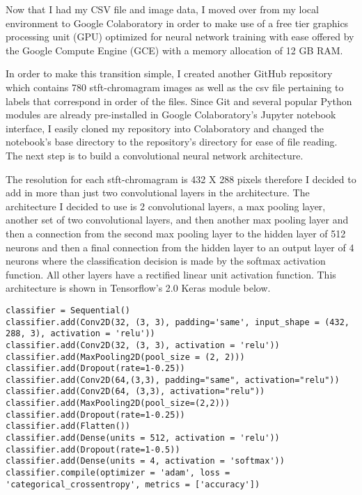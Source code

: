 Now that I had my CSV file and image data, I moved over from my local environment to Google Colaboratory in order to make use of a free tier graphics processing unit (GPU) optimized for neural network training with ease offered by the Google Compute Engine (GCE) with a memory allocation of 12 GB RAM.
\par
In order to make this transition simple, I created another GitHub repository which contains 780 stft-chromagram images as well as the csv file pertaining to labels that correspond in order of the files. Since Git and several popular Python modules are already pre-installed in Google Colaboratory's Jupyter notebook interface, I easily cloned my repository into Colaboratory and changed the notebook's base directory to the repository's directory for ease of file reading. The next step is to build a convolutional neural network architecture.
\par
The resolution for each stft-chromagram is 432 X 288 pixels therefore I decided to add in more than just two convolutional layers in the architecture. The architecture I decided to use is 2 convolutional layers, a max pooling layer, another set of two convolutional layers, and then another max pooling layer and then a connection from the second max pooling layer to the hidden layer of 512 neurons and then a final connection from the hidden layer to an output layer of 4 neurons where the classification decision is made by the softmax activation function. All other layers have a rectified linear unit activation function. This architecture is shown in Tensorflow's 2.0 Keras module below.

\begin{lstlisting}
classifier = Sequential()
classifier.add(Conv2D(32, (3, 3), padding='same', input_shape = (432, 288, 3), activation = 'relu'))
classifier.add(Conv2D(32, (3, 3), activation = 'relu'))
classifier.add(MaxPooling2D(pool_size = (2, 2)))
classifier.add(Dropout(rate=1-0.25))
classifier.add(Conv2D(64,(3,3), padding="same", activation="relu"))
classifier.add(Conv2D(64, (3,3), activation="relu"))
classifier.add(MaxPooling2D(pool_size=(2,2)))
classifier.add(Dropout(rate=1-0.25))
classifier.add(Flatten())
classifier.add(Dense(units = 512, activation = 'relu'))
classifier.add(Dropout(rate=1-0.5))
classifier.add(Dense(units = 4, activation = 'softmax'))
classifier.compile(optimizer = 'adam', loss = 'categorical_crossentropy', metrics = ['accuracy'])
\end{lstlisting}
